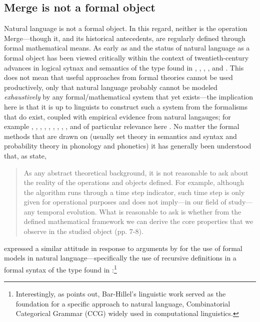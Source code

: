 \documentclass[11pt,twoside]{article}
\begin{document}
\subsection{Merge is not a formal object}
Natural language is not a formal object. In this regard, neither is the operation Merge---though it, and its historical antecedents, are regularly defined through formal mathematical means. As early as \cite{chomsky55logicalsyntax} and \cite{chomsky57ss} the status of natural language as a formal object has been viewed critically within the context of twentieth-century advances in logical sytnax and semantics of the type found in \cite{carnap:1937}, \cite{ayer:1936}, \cite{riechenbach:1947}, \cite{quine:1953}, and \cite{tarski:1956}. This does not mean that useful approaches from formal theories cannot be used productively, only that natural language {probably} cannot be modeled \textsl{exhaustively} by any formal/mathematical system that yet exists---the implication here is that it is up to linguists to construct such a system from the formalisms that do exist, coupled with empirical evidence from natural langauges; for example \cite{langpostal:1984}, \cite{pmw:1990}, \cite{hornstein:1992}, \cite{prsmol:1993}, \cite{uriagereka:1998}, \cite{chmg:2000}, \cite{tessmol:2000}, \cite{bhj:2003}, \cite{niyogi:2006}, and of particular relevance here \cite{fortcm:toappear}. No matter the formal methods that are drawn on (usually set theory in semantics and syntax and probability theory in phonology and phonetics) it has generally been understood that, as \citep[7-8]{fortcm:toappear} state,

\begin{quotation}
As any abstract theoretical background, it is not reasonable to ask about
the reality of the operations and objects defined. For example, although the algorithm runs
through a time step indicator, such time step is only given for operational purposes and does not
imply---in our field of study---any temporal evolution. What is reasonable to ask is whether from
the defined mathematical framework we can derive the core properties that we observe in the
studied object (pp. 7-8). 
\end{quotation}

\citep[45]{chomsky55logicalsyntax} expressed a similar attitude in response to arguments by \cite{barhillel:1954} for the use of formal models in natural language---specifically the use of recursive definitions in a formal syntax of the type found in \cite{carnap:1937}:\footnote{Interestingly, as \cite{tomalin:2006} points out, Bar-Hillel's linguistic work served as the foundation for a specific approach to natural language, Combinatorial Categorical Grammar (CCG) widely used in computational linguistics.} 
\end{document}
